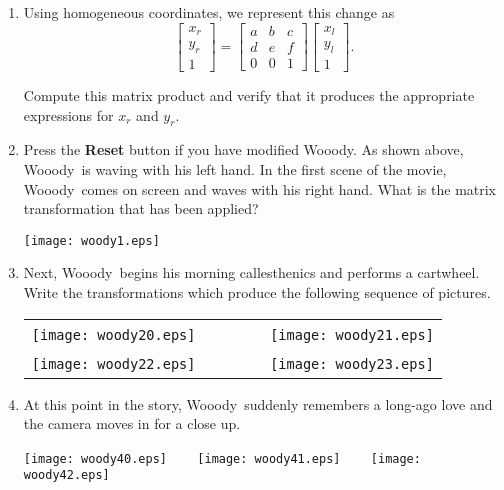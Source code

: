 \documentclass[12pt]{article}
\newcommand{\col}[3]{\left[\begin{array}{c} #1 \\ #2 \\ #3\end{array}
  \right]}
\newcommand{\woodyn}{Wooody}
\newcommand{\woody}{Wooody\ }
\begin{document}
\bigskip
\begin{enumerate}
\item  Using homogeneous coordinates, we represent this change as
  $$
  \left[\begin{array}{c} x_r \\ y_r \\ 1 \end{array}\right] = 
  \left[\begin{array}{ccc}
      a & b & c \\
      d & e & f \\
      0 & 0 & 1
    \end{array}\right]
  \col{x_l}{y_l}{1}.$$

  Compute this matrix product and verify that it produces the
  appropriate expressions for $x_r$ and $y_r$.

  \vspace*{1.5in}
  
\item  Press the {\bf Reset} button if you have modified
  \woodyn.  As shown above, \woody is waving with his left hand.  In
  the first scene of the movie, \woody comes on screen and waves with
  his right hand.  What is the matrix transformation that has been
  applied?  

  \texttt{[image: woody1.eps]}

  \bigskip
\item  Next, \woody begins his morning callesthenics and performs
  a cartwheel.  
  Write the transformations which produce the following sequence of
  pictures. 

  \begin{tabular}{cc}
    \texttt{[image: woody20.eps]} ~~~ & ~~~
    \texttt{[image: woody21.eps]} \\
    \texttt{[image: woody22.eps]} ~~~ & ~~~
    \texttt{[image: woody23.eps]} 
  \end{tabular}
  
\newpage
\item  At this point in the story, \woody suddenly remembers a
  long-ago love and the camera moves in for a close up.
  \begin{center}
    \texttt{[image: woody40.eps]} ~~~
    \texttt{[image: woody41.eps]} ~~~
    \texttt{[image: woody42.eps]} 
  \end{center}
  

\end{enumerate}
\end{document}
